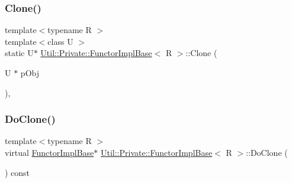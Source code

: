 \subsubsection{\texorpdfstring{Clone()}{Clone()}\hspace{0.1cm}{\footnotesize\ttfamily [3/3]}}
{\footnotesize\ttfamily template$<$typename R $>$ \\
template$<$class U $>$ \\
static U$\ast$ \mbox{\hyperlink{structUtil_1_1Private_1_1FunctorImplBase}{Util\+::\+Private\+::\+Functor\+Impl\+Base}}$<$ R $>$\+::Clone (\begin{DoxyParamCaption}\item[{U $\ast$}]{p\+Obj }\end{DoxyParamCaption})\hspace{0.3cm}{\ttfamily [inline]}, {\ttfamily [static]}}

\mbox{\label{structUtil_1_1Private_1_1FunctorImplBase_a3e0e91d434c55173ed546839b53721c5}} 
\subsubsection{\texorpdfstring{DoClone()}{DoClone()}\hspace{0.1cm}{\footnotesize\ttfamily [1/3]}}
{\footnotesize\ttfamily template$<$typename R $>$ \\
virtual \mbox{\hyperlink{structUtil_1_1Private_1_1FunctorImplBase}{Functor\+Impl\+Base}}$\ast$ \mbox{\hyperlink{structUtil_1_1Private_1_1FunctorImplBase}{Util\+::\+Private\+::\+Functor\+Impl\+Base}}$<$ R $>$\+::Do\+Clone (\begin{DoxyParamCaption}{ }\end{DoxyParamCaption}) const\hspace{0.3cm}{\ttfamily [pure virtual]}}

\mbox{\label{structUtil_1_1Private_1_1FunctorImplBase_a3e0e91d434c55173ed546839b53721c5}} 
